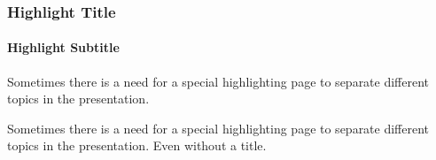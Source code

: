 	 \begin{frame}[highlight]
	    \frametitle{Highlight Title}
	    \framesubtitle{Highlight Subtitle}
	    \centering
	    Sometimes there is a need for a special highlighting page to separate different topics in the presentation.
 	 \end{frame}
 	 
      \begin{frame}[highlight]
        \centering
	    Sometimes there is a need for a special highlighting page to separate different topics in the presentation.
	    \vspace{1em}
	    Even without a title.
 	 \end{frame}

